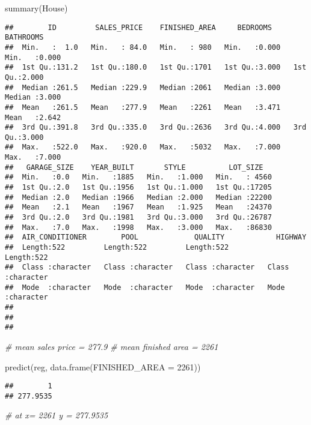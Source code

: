 \documentclass[
]{article}
\newenvironment{Shaded}{\begin{snugshade}}{\end{snugshade}}
\newcommand{\AttributeTok}[1]{\textcolor[rgb]{0.77,0.63,0.00}{#1}}
\newcommand{\CommentTok}[1]{\textcolor[rgb]{0.56,0.35,0.01}{\textit{#1}}}
\newcommand{\DecValTok}[1]{\textcolor[rgb]{0.00,0.00,0.81}{#1}}
\newcommand{\FunctionTok}[1]{\textcolor[rgb]{0.00,0.00,0.00}{#1}}
\newcommand{\NormalTok}[1]{#1}
\begin{document}
\begin{Shaded}
\begin{Highlighting}[]
\FunctionTok{summary}\NormalTok{(House)}
\end{Highlighting}
\end{Shaded}

\begin{verbatim}
##        ID         SALES_PRICE    FINISHED_AREA     BEDROOMS       BATHROOMS    
##  Min.   :  1.0   Min.   : 84.0   Min.   : 980   Min.   :0.000   Min.   :0.000  
##  1st Qu.:131.2   1st Qu.:180.0   1st Qu.:1701   1st Qu.:3.000   1st Qu.:2.000  
##  Median :261.5   Median :229.9   Median :2061   Median :3.000   Median :3.000  
##  Mean   :261.5   Mean   :277.9   Mean   :2261   Mean   :3.471   Mean   :2.642  
##  3rd Qu.:391.8   3rd Qu.:335.0   3rd Qu.:2636   3rd Qu.:4.000   3rd Qu.:3.000  
##  Max.   :522.0   Max.   :920.0   Max.   :5032   Max.   :7.000   Max.   :7.000  
##   GARAGE_SIZE    YEAR_BUILT       STYLE          LOT_SIZE    
##  Min.   :0.0   Min.   :1885   Min.   :1.000   Min.   : 4560  
##  1st Qu.:2.0   1st Qu.:1956   1st Qu.:1.000   1st Qu.:17205  
##  Median :2.0   Median :1966   Median :2.000   Median :22200  
##  Mean   :2.1   Mean   :1967   Mean   :1.925   Mean   :24370  
##  3rd Qu.:2.0   3rd Qu.:1981   3rd Qu.:3.000   3rd Qu.:26787  
##  Max.   :7.0   Max.   :1998   Max.   :3.000   Max.   :86830  
##  AIR_CONDITIONER        POOL             QUALITY            HIGHWAY         
##  Length:522         Length:522         Length:522         Length:522        
##  Class :character   Class :character   Class :character   Class :character  
##  Mode  :character   Mode  :character   Mode  :character   Mode  :character  
##                                                                             
##                                                                             
## 
\end{verbatim}

\begin{Shaded}
\begin{Highlighting}[]
\CommentTok{\# mean sales price = 277.9}
\CommentTok{\# mean finished area = 2261}

\FunctionTok{predict}\NormalTok{(reg, }\FunctionTok{data.frame}\NormalTok{(}\AttributeTok{FINISHED\_AREA =} \DecValTok{2261}\NormalTok{))}
\end{Highlighting}
\end{Shaded}

\begin{verbatim}
##        1 
## 277.9535
\end{verbatim}

\begin{Shaded}
\begin{Highlighting}[]
\CommentTok{\# at x= 2261 y = 277.9535}
\end{Highlighting}
\end{Shaded}
\end{document}
